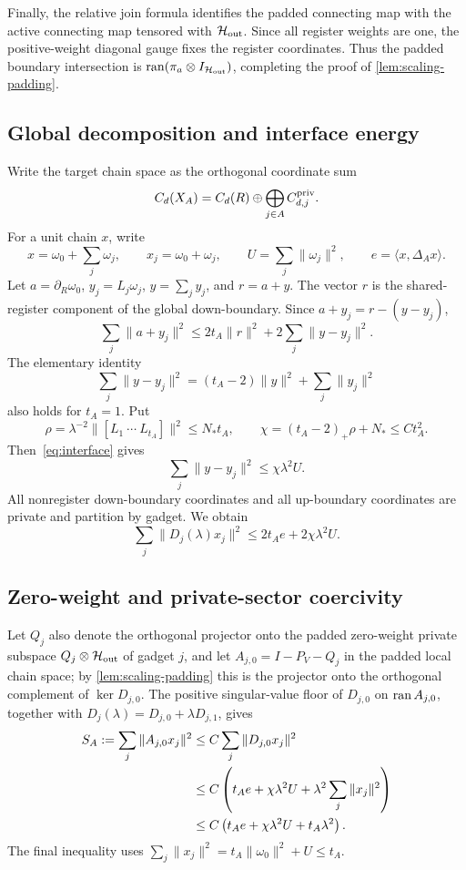 Finally, the relative join formula identifies the padded connecting map with
the active connecting map tensored with
\(\mathcal{H}_{\rm out}\).  Since all register weights are one, the positive-weight
diagonal gauge fixes the register coordinates.  Thus the padded boundary
intersection is \(\operatorname{ran}(\pi_a\otimes I_{\mathcal{H}_{\rm out}})\), completing the proof
of \cref{lem:scaling-padding}.

\subsection{Global decomposition and interface energy}

Write the target chain space as the orthogonal coordinate sum
\[
C_d(X_A)=C_d(R)\oplus\bigoplus_{j\in A}C_{d,j}^{\rm priv}.
\]
For a unit chain \(x\), write
\[
x=\omega_0+\sum_j\omega_j,
\qquad
x_j=\omega_0+\omega_j,
\qquad
U=\sum_j\|\omega_j\|^2,
\qquad
e=\langle x,\Delta_Ax\rangle.
\]
Let \(a=\partial_R\omega_0\), \(y_j=L_j\omega_j\), \(y=\sum_jy_j\), and \(r=a+y\). The vector \(r\) is the shared-register component of the global down-boundary. Since
\(
a+y_j=r-(y-y_j)
\),
\[
\sum_j\|a+y_j\|^2
\le2t_A\|r\|^2+2\sum_j\|y-y_j\|^2.
\]
The elementary identity
\[
\sum_j\|y-y_j\|^2
=(t_A-2)\|y\|^2+\sum_j\|y_j\|^2
\]
also holds for \(t_A=1\). Put
\[
\rho=\lambda^{-2}\|[L_1\ \cdots\ L_{t_A}]\|^2
\le N_*t_A,
\qquad
\chi=(t_A-2)_+\rho+N_*\le C t_A^2.
\]
Then~\cref{eq:interface} gives
\[
\sum_j\|y-y_j\|^2\le\chi\lambda^2U.
\]
All nonregister down-boundary coordinates and all up-boundary coordinates are private and partition by gadget. We obtain
\begin{equation}
\label{eq:appendix-local-energy}
\sum_j\|D_j(\lambda)x_j\|^2
\le2t_Ae+2\chi\lambda^2U.
\end{equation}

\subsection{Zero-weight and private-sector coercivity}

Let \(Q_j\) also denote the orthogonal projector onto the padded zero-weight private subspace \(Q_j\otimes\mathcal{H}_{\rm out}\) of gadget \(j\), and let \(A_{j,0}=I-P_V-Q_j\) in the padded local chain space; by \cref{lem:scaling-padding} this is the projector onto the orthogonal complement of \(\ker D_{j,0}\). The positive singular-value floor of \(D_{j,0}\) on \(\operatorname{ran} A_{j,0}\), together with
\(
D_j(\lambda)=D_{j,0}+\lambda D_{j,1}
\), gives
\begin{align}
S_A:=\sum_j\|A_{j,0}x_j\|^2
&\le C\sum_j\|D_{j,0}x_j\|^2\notag\\
&\le C\left(
t_Ae+\chi\lambda^2U+
\lambda^2\sum_j\|x_j\|^2
\right)\notag\\
&\le C\left(t_Ae+\chi\lambda^2U+t_A\lambda^2\right).
\label{eq:appendix-SA}
\end{align}
The final inequality uses
\(
\sum_j\|x_j\|^2
=t_A\|\omega_0\|^2+U\le t_A
\).

